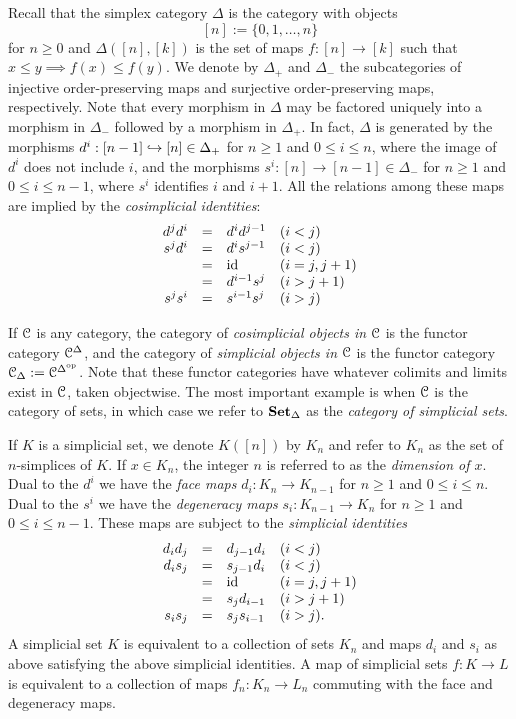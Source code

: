 \documentclass[../main.tex]{subfiles}
\begin{document}
Recall that the simplex category $\Delta$ is the category with objects
\[[n]:=\{0,1,\ldots,n\}\]
for $n\geq0$ and $\Delta([n],[k])$ is the set of maps $f:[n]\to[k]$ such that $x\leq y\implies f(x)\leq f(y)$. We denote by $\Delta_+$ and $\Delta_-$ the subcategories of injective order-preserving maps and surjective order-preserving maps, respectively. Note that every morphism in $\Delta$ may be factored uniquely into a morphism in $\Delta_-$ followed by a morphism in $\Delta_+$. In fact, $\Delta$ is generated by the morphisms $d^i:[n-1]\hookrightarrow[n]\in\Delta_+$ for $n\geq1$ and $0\leq i\leq n$, where the image of $d^i$ does not include $i$, and the morphisms $s^i:[n]\to[n-1]\in\Delta_-$ for $n\geq1$ and $0\leq i\leq n-1$, where $s^i$ identifies $i$ and $i+1$. All the relations among these maps are implied by the \textit{cosimplicial identities}:
\[
  \begin{array}{rcll}
    d^jd^i & = & d^id^{j-1} & (i<j) \\
    s^jd^i & = & d^is^{j-1} & (i<j) \\
    & = & \mathrm{id} & (i=j,j+1) \\
    & = & d^{i-1}s^j & (i>j+1) \\
    s^js^i & = & s^{i-1}s^j & (i>j)
  \end{array}
\]

If $\mathcal C$ is any category, the category of \textit{cosimplicial objects in $\mathcal C$} is the functor category $\mathcal C^\Delta$, and the category of \textit{simplicial objects in $\mathcal C$} is the functor category $\mathcal C_\Delta:=\mathcal C^{\Delta^{\mathrm{op}}}$. Note that these functor categories have whatever colimits and limits exist in $\mathcal C$, taken objectwise. The most important example is when $\mathcal C$ is the category of sets, in which case we refer to $\mathbf{Set}_\Delta$ as the \textit{category of simplicial sets}.

If $K$ is a simplicial set, we denote $K([n])$ by $K_n$ and refer to $K_n$ as the set of $n$-simplices of $K$. If $x\in K_n$, the integer $n$ is referred to as the \textit{dimension of $x$}. Dual to the $d^i$ we have the \textit{face maps} $d_i:K_n\to K_{n-1}$ for $n\geq1$ and $0\leq i\leq n$. Dual to the $s^i$ we have the \textit{degeneracy maps} $s_i:K_{n-1}\to K_n$ for $n\geq1$ and $0\leq i\leq n-1$. These maps are subject to the \textit{simplicial identities}
\[
  \begin{array}{rcll}
    d_id_j & = & d_{j-1}d_i & (i<j) \\
    d_is_j & = & s_{j-1}d_i & (i<j) \\
    & = & \mathrm{id} & (i=j,j+1) \\
    & = & s_jd_{i-1} & (i>j+1) \\
    s_is_j & = & s_{j}s_{i-1} & (i>j).
  \end{array}
\]
A simplicial set $K$ is equivalent to a collection of sets $K_n$ and maps $d_i$ and $s_i$ as above satisfying the above simplicial identities. A map of simplicial sets $f:K\to L$ is equivalent to a collection of maps $f_n:K_n\to L_n$ commuting with the face and degeneracy maps.
\end{document}
